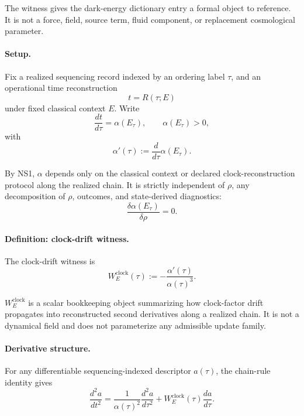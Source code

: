 \documentclass[aps,prx,onecolumn,11pt]{revtex4-2}
\theoremstyle{plain}
\theoremstyle{definition}
\theoremstyle{remark}
\begin{document}
The witness gives the dark-energy dictionary entry a formal object to
reference. It is not a force, field, source term, fluid component, or
replacement cosmological parameter.

\paragraph{Setup.}

Fix a realized sequencing record indexed by an ordering label \(\tau\),
and an operational time reconstruction
\[
t=R(\tau;E)
\]
under fixed classical context \(E\). Write
\begin{equation}
\frac{dt}{d\tau}
=
\alpha(E_\tau),
\qquad
\alpha(E_\tau)>0,
\label{eq:clock_drift_alpha_def}
\end{equation}
with
\[
\alpha'(\tau)
:=
\frac{d}{d\tau}\alpha(E_\tau).
\]

By NS1, \(\alpha\) depends only on the classical context or declared
clock-reconstruction protocol along the realized chain. It is strictly
independent of \(\rho\), any decomposition of \(\rho\), outcomes, and
state-derived diagnostics:
\begin{equation}
\frac{\delta \alpha(E_\tau)}{\delta \rho}
=
0.
\label{eq:clock_drift_NS1}
\end{equation}

\paragraph{Definition: clock-drift witness.}

The clock-drift witness is
\begin{equation}
W^{\mathrm{clock}}_E(\tau)
:=
-\frac{\alpha'(\tau)}{\alpha(\tau)^3}.
\label{eq:clock_drift_witness_def}
\end{equation}

\(W^{\mathrm{clock}}_E\) is a scalar bookkeeping object summarizing how
clock-factor drift propagates into reconstructed second derivatives
along a realized chain. It is not a dynamical field and does not
parameterize any admissible update family.

\paragraph{Derivative structure.}

For any differentiable sequencing-indexed descriptor \(a(\tau)\), the
chain-rule identity gives
\begin{equation}
\frac{d^2a}{dt^2}
=
\frac{1}{\alpha(\tau)^2}
\frac{d^2a}{d\tau^2}
+
W^{\mathrm{clock}}_E(\tau)
\frac{da}{d\tau}.
\label{eq:clock_drift_derivative_structure}
\end{equation}
\end{document}
